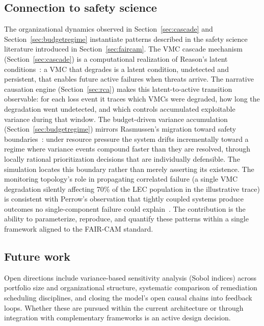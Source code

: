 \documentclass[11pt,a4paper]{article}
\begin{document}
\subsection{Connection to safety science}

The organizational dynamics observed in Section~\ref{sec:cascade} and Section~\ref{sec:budgetregime} instantiate patterns described in the safety science literature introduced in Section~\ref{sec:faircam}. The VMC cascade mechanism (Section~\ref{sec:cascade}) is a computational realization of Reason's latent conditions~\citep{Reason1990}: a VMC that degrades is a latent condition, undetected and persistent, that enables future active failures when threats arrive. The narrative causation engine (Section~\ref{sec:rca}) makes this latent-to-active transition observable: for each loss event it traces which VMCs were degraded, how long the degradation went undetected, and which controls accumulated exploitable variance during that window. The budget-driven variance accumulation (Section~\ref{sec:budgetregime}) mirrors Rasmussen's migration toward safety boundaries~\citep{Rasmussen1997}: under resource pressure the system drifts incrementally toward a regime where variance events compound faster than they are resolved, through locally rational prioritization decisions that are individually defensible. The simulation locates this boundary rather than merely asserting its existence. The monitoring topology's role in propagating correlated failure (a single VMC degradation silently affecting 70\% of the LEC population in the illustrative trace) is consistent with Perrow's observation that tightly coupled systems produce outcomes no single-component failure could explain~\citep{Perrow1984}. The contribution is the ability to parameterize, reproduce, and quantify these patterns within a single framework aligned to the FAIR-CAM standard.

\subsection{Future work}

Open directions include variance-based sensitivity analysis (Sobol indices) across portfolio size and organizational structure, systematic comparison of remediation scheduling disciplines, and closing the model's open causal chains into feedback loops. Whether these are pursued within the current architecture or through integration with complementary frameworks is an active design decision.
\end{document}

